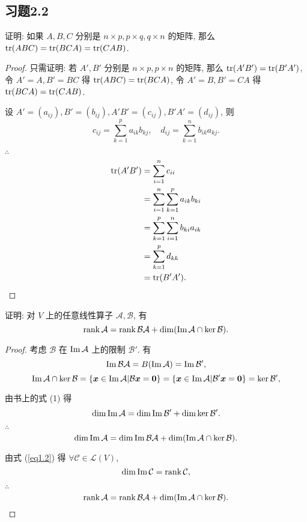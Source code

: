 \documentclass[color=black,device=normal,lang=cn,mode=geye]{elegantnote}
\begin{document}
\subsection{习题2.2}
\begin{exercise}%
    证明: 如果 $A,B,C$ 分别是 $n\times p,p\times q,q\times n$ 的矩阵, 那么 $\operatorname{tr} (ABC)=\operatorname{tr} (BCA)=\operatorname{tr} (CAB)$.
\end{exercise}
\begin{proof}
    只需证明: 若 $A',B'$ 分别是 $n\times p,p\times n$ 的矩阵, 那么 $\operatorname{tr} (A'B')=\operatorname{tr} (B'A')$, 令 $A'=A,B'=BC$ 得 $\operatorname{tr} (ABC)=\operatorname{tr} (BCA)$, 令 $A'=B,B'=CA$ 得 $\operatorname{tr} (BCA)=\operatorname{tr} (CAB)$.

    设 $A'=(a_{ij}),B'=(b_{ij}),A'B'=(c_{ij}),B'A'=(d_{ij})$, 则
    \[c_{ij}=\sum\limits_{k=1}^pa_{ik}b_{kj},\quad d_{ij}=\sum\limits_{k=1}^nb_{ik}a_{kj}.\]

    $\therefore$
    \begin{align*}
        \operatorname{tr} (A'B') & =\sum\limits_{i=1}^nc_{ii} \\
        & =\sum\limits_{i=1}^n\sum\limits_{k=1}^pa_{ik}b_{ki} \\
        & =\sum\limits_{k=1}^p\sum\limits_{i=1}^nb_{ki}a_{ik} \\
        & =\sum\limits_{k=1}^pd_{kk} \\
        & =\operatorname{tr} (B'A').\qedhere
    \end{align*}
\end{proof}
\addtocounter{exercise}{2}
\begin{exercise}\label{ex2.5}
    证明: 对 $V$ 上的任意线性算子 $\mathcal{A},\mathcal{B}$, 有
    \[\operatorname{rank} \mathcal{A}=\operatorname{rank} \mathcal{BA}+\dim(\operatorname{Im} \mathcal{A}\cap\ker\mathcal{B}).\]
\end{exercise}
\begin{proof}
    考虑 $\mathcal{B}$ 在 $\operatorname{Im} \mathcal{A}$ 上的限制 $\mathcal{B}'$. 有
    \[\operatorname{Im} \mathcal{BA}=B(\operatorname{Im} \mathcal{A})=\operatorname{Im} \mathcal{B}',\]
    \[\operatorname{Im} \mathcal{A}\cap\ker\mathcal{B}=\{\boldsymbol{x}\in\operatorname{Im} \mathcal{A}|\mathcal{B}\boldsymbol{x}=\boldsymbol{0}\}=\{\boldsymbol{x}\in\operatorname{Im} \mathcal{A}|\mathcal{B}'\boldsymbol{x}=\boldsymbol{0}\}=\ker\mathcal{B}',\]

    由书上的式 (1) 得
    \[\dim\operatorname{Im} \mathcal{A}=\dim\operatorname{Im} \mathcal{B}'+\dim\ker\mathcal{B}'.\]

    $\therefore$
    \[\dim\operatorname{Im} \mathcal{A}=\dim\operatorname{Im} \mathcal{BA}+\dim(\operatorname{Im} \mathcal{A}\cap\ker\mathcal{B}).\]

    由式 (\ref{eq1.2}) 得 $\forall\mathcal{C}\in\mathcal{L}(V)$,
    \[\dim\operatorname{Im} \mathcal{C}=\operatorname{rank} \mathcal{C},\]

    $\therefore$
    \[\operatorname{rank} \mathcal{A}=\operatorname{rank} \mathcal{BA}+\dim(\operatorname{Im} \mathcal{A}\cap\ker\mathcal{B}).\qedhere\]
\end{proof}
\end{document}
